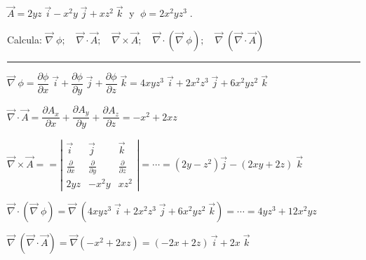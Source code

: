 \vspace{3mm}
\begin{miejercicio}

$\overrightarrow A=2yz\; \vec i -x^2y\; \vec j +xz^2\; \vec k\; $ y $\; \phi=2x^2yz^3\; $. 

Calcula: $\overrightarrow \nabla \; \phi; \quad \overrightarrow \nabla \cdot \overrightarrow A; \quad \overrightarrow \nabla \times \overrightarrow A; \quad \overrightarrow \nabla \cdot (\overrightarrow \nabla \; \phi); \quad \overrightarrow \nabla \; (\overrightarrow \nabla \cdot \overrightarrow A) $	

\rule{200pt}{0.1pt}

\vspace{1mm}

$\overrightarrow \nabla \; \phi= \dfrac {\partial \phi}{\partial x}\; \vec i + \dfrac {\partial \phi}{\partial y}\; \vec j + \dfrac {\partial \phi}{\partial z}\; \vec k = 4xyz^3\; \vec i + 2x^2z^3\; \vec j + 6x^2yz^2\; \vec k$

$\overrightarrow \nabla \cdot \overrightarrow A=\dfrac {\partial A_x}{\partial x } + \dfrac {\partial A_y}{\partial y }+ \dfrac {\partial A_z}{\partial z }= -x^2+2xz$

$\overrightarrow \nabla \times \overrightarrow A== \left|
\begin{matrix}
\vec i & \vec j	& \vec k \\
\frac {\partial}{\partial x} & \frac {\partial}{\partial y} & \frac {\partial}{\partial z} \\
2yz & -x^2y & xz^2
\end{matrix}  \right|=\cdots =(2y-z^2) \vec j - (2xy+2z)\; \vec k$

$\overrightarrow \nabla \cdot (\overrightarrow \nabla \; \phi)= \overrightarrow \nabla \; ( 4xyz^3\; \vec i + 2x^2z^3\; \vec j + 6x^2yz^2\; \vec k)= \cdots = 4yz^3+12x^2yz$

$\overrightarrow \nabla \; (\overrightarrow \nabla \cdot \overrightarrow A)  =\overrightarrow \nabla (-x^2+2xz)=(-2x+2z)\, \vec i + 2x \; \vec k$
\end{miejercicio}

